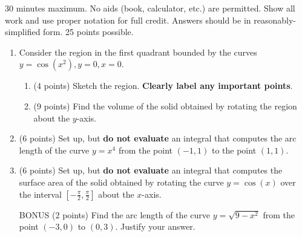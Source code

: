 \documentclass[12pt]{article}
\newcommand{\ds}{\displaystyle}
\begin{document}
30 minutes maximum.  No aids (book, calculator, etc.) are permitted.
Show all work and use proper notation for full credit.  Answers should
be in reasonably-simplified form.  25 points possible.

\begin{enumerate}
\item Consider the region in the first quadrant bounded by the curves $\ds
  y=\cos\left(x^2\right), y=0, x=0$.
  
\begin{enumerate}
\item (4 points) Sketch the region. {\bf Clearly label any important points}.
  \vfill

\item (9 points) Find the volume of the solid
  obtained by rotating the region about the $y$-axis.
  \vfill
  \vfill
  \end{enumerate}

  \newpage

\item (6 points) Set up, but {\bf do not evaluate} an integral that computes
  the arc length of the curve $y=x^4$ from the point $(-1,1)$ to the point $(1,1)$.
  \vfill

\item (6 points) Set up, but {\bf do not evaluate} an integral that computes
  the surface area of the solid obtained by rotating the curve
  $y=\cos(x)$ over the interval $\left[ -\frac{\pi}{2},\frac{\pi}{2}
  \right]$ about the $x$-axis.
  \vfill

  BONUS (2 points) Find the arc length of the curve $\ds y = \sqrt{9 -
    x^2}$ from the point $(-3,0)$ to $(0,3)$. Justify your answer.
  \vfill


\end{enumerate}
\end{document}
